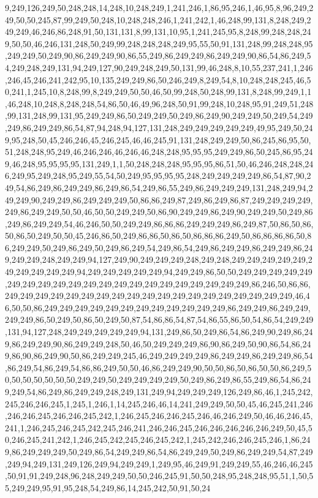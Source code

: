 9,249,126,249,50,248,248,14,248,10,248,249,1,241,246,1,86,95,246,1,46,95,8,96,249,249,50,50,245,87,99,249,50,248,10,248,248,246,1,241,242,1,46,248,99,131,8,248,249,249,249,46,246,86,248,91,50,131,131,8,99,131,10,95,1,241,245,95,8,248,99,248,248,249,50,50,46,246,131,248,50,249,99,248,248,248,249,95,55,50,91,131,248,99,248,248,95,249,249,50,249,90,86,249,249,90,86,55,249,86,249,249,86,249,249,90,86,54,86,249,54,249,248,249,131,94,249,127,90,249,248,249,50,131,99,46,248,8,10,55,237,241,1,246,246,45,246,241,242,95,10,135,249,249,86,50,246,249,8,249,54,8,10,248,248,245,46,50,241,1,245,10,8,248,99,8,249,249,50,50,46,50,99,248,50,248,99,131,8,248,99,249,1,1,46,248,10,248,8,248,248,54,86,50,46,49,96,248,50,91,99,248,10,248,95,91,249,51,248,99,131,248,99,131,95,249,249,86,50,249,249,50,249,86,249,90,249,249,50,249,54,249,249,86,249,249,86,54,87,94,248,94,127,131,248,249,249,249,249,249,49,95,249,50,249,95,248,50,45,246,246,45,246,245,46,46,245,91,131,248,249,249,50,86,245,86,95,50,51,248,248,95,249,46,246,246,46,246,46,248,248,95,95,95,249,249,86,50,245,86,95,249,46,248,95,95,95,95,131,249,1,1,50,248,248,248,95,95,95,86,51,50,46,246,248,248,246,249,95,249,248,95,249,55,54,50,249,95,95,95,95,248,249,249,249,249,86,54,87,90,249,54,86,249,86,249,249,86,249,86,54,249,86,55,249,86,249,249,249,131,248,249,94,249,249,90,249,249,86,249,249,249,50,86,86,249,87,249,86,249,86,87,249,249,249,249,249,86,249,249,50,50,46,50,50,249,249,50,86,90,249,249,86,249,90,249,249,50,249,86,249,86,249,249,54,46,246,50,50,249,249,86,86,86,249,249,249,86,249,87,50,86,50,86,50,86,50,249,50,50,45,246,86,50,249,86,86,50,86,50,86,86,86,249,50,86,86,86,86,50,86,249,249,50,249,86,249,50,249,86,249,54,249,86,54,249,86,249,249,86,249,249,86,249,249,249,248,249,249,94,127,249,90,249,249,249,248,249,248,249,249,249,249,249,249,249,249,249,249,94,249,249,249,249,249,94,249,249,86,50,50,249,249,249,249,249,249,249,249,249,249,249,249,249,249,249,249,249,249,249,249,249,86,246,50,86,86,249,249,249,249,249,249,249,249,249,249,249,249,249,249,249,249,249,249,249,46,46,50,50,86,249,249,249,249,249,249,249,249,249,249,249,249,86,249,249,86,249,249,249,249,86,50,249,50,86,50,249,50,87,54,86,86,54,87,54,86,55,86,50,54,86,54,249,249,131,94,127,248,249,249,249,249,249,94,131,249,86,50,249,86,54,86,249,90,249,86,249,86,249,249,90,86,249,249,248,50,46,50,249,249,249,86,90,86,249,50,90,86,54,86,249,86,90,86,249,90,50,86,249,249,245,46,249,249,249,249,86,249,249,86,249,249,86,54,86,249,54,86,249,54,86,86,249,50,50,46,86,249,249,90,50,50,86,50,86,50,50,86,249,50,50,50,50,50,50,50,249,249,50,249,249,249,249,50,249,86,249,86,55,249,86,54,86,249,249,54,86,249,86,249,249,248,249,131,249,94,249,249,249,126,249,86,46,1,245,242,245,246,246,245,1,245,1,246,1,14,245,246,46,14,241,249,249,50,50,45,46,245,241,246,246,246,245,246,246,245,242,1,246,245,246,246,245,246,46,246,249,50,46,46,246,45,241,1,246,245,246,245,242,245,246,241,246,246,245,246,246,246,246,246,249,50,45,50,246,245,241,242,1,246,245,242,245,246,245,242,1,245,242,246,246,245,246,1,86,249,86,249,249,249,50,249,86,54,249,249,86,54,86,249,249,50,249,86,249,249,54,87,249,249,94,249,131,249,126,249,94,249,249,1,249,95,46,249,91,249,249,55,46,246,46,245,50,91,91,249,248,96,248,249,249,50,50,246,245,91,50,50,248,95,248,248,95,51,1,50,55,249,249,95,91,95,248,54,249,86,14,245,242,50,91,50,24